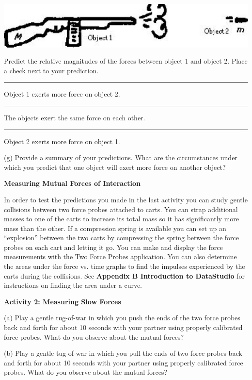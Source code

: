 \vspace{0.3cm}
{\par\centering \includegraphics{newtons_laws_fig6.eps} \par}
\vspace{0.3cm}

Predict the relative magnitudes of the forces between object 1 and object 2.
Place a check next to your prediction. 

\rule{0.5in}{0.1pt} Object 1 exerts more force on object 2. 

\rule{0.5in}{0.1pt} The objects exert the same force on each other. 

\rule{0.5in}{0.1pt} Object 2 exerts more force on object 1.

(g) Provide a summary of your predictions. What are the circumstances under
which you predict that one object will exert more force on another object?
\vspace{30mm}

\textbf{Measuring Mutual Forces of Interaction }

In order to test the predictions you made in the last activity you can study
gentle collisions between two force probes attached to carts. You can strap
additional masses to one of the carts to increase its total mass so it has significantly
more mass than the other. If a compression spring is available you can set up
an ``explosion'' between the two carts by compressing the spring
between the force probes on each cart and letting it go. You can make and display
the force measurements with the Two Force Probes application. You can also determine
the areas under the force vs. time graphs to find the impulses experienced by
the carts during the collisions. See \textbf{Appendix B Introduction to DataStudio}
for instructions on finding the area under a curve.

\textbf{Activity 2: Measuring Slow Forces} 

(a) Play a gentle tug-of-war in which you push the ends of the two force probes
back and forth for about 10 seconds with your partner using properly calibrated
force probes. What do you observe about the mutual forces?
\vspace{20mm}

(b) Play a gentle tug-of-war in which you pull the ends of two force probes
back and forth for about 10 seconds with your partner using properly calibrated
force probes. What do you observe about the mutual forces?
\vspace{20mm}

